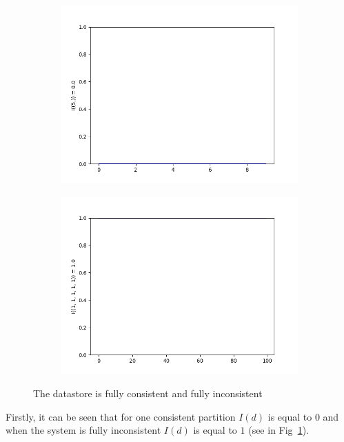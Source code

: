 \documentclass{llncs}
\begin{document}
\begin{figure}[p]
\begin{subfigure}{0.5\linewidth}
\centering\includegraphics[scale=0.4]{images/1-consistent-partition.png}\hfill
\end{subfigure}
\begin{subfigure}{0.5\linewidth}
\centering\includegraphics[scale=0.4]{images/1-1-1-1-1-consistent-partitions-probability.png}
\end{subfigure}
\caption{The datastore is fully consistent and fully inconsistent}\label{pic:fully}
\end{figure}
%
Firstly, it can be seen that for one consistent partition $I(d)$ is equal to $0$ and when the system is fully inconsistent $I(d)$ is equal to $1$ (see in Fig~\ref{pic:fully}).
\end{document}
